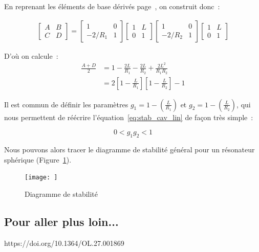 \documentclass[a4paper]{book}
\begin{document}
En reprenant les éléments de base dérivés page~\pageref{subsec:el_base}, on construit donc~:

\begin{gather}
  \begin{bmatrix}
   A & B \\
   C & D 
   \end{bmatrix}
   =
  \begin{bmatrix}
   1 & 0 \\
   -2/R_1 & 1 
  \end{bmatrix}
  \begin{bmatrix}
   1 & L \\
   0 & 1 
   \end{bmatrix}
  \begin{bmatrix}
   1 & 0 \\
   -2/R_2 & 1 
  \end{bmatrix}
  \begin{bmatrix}
   1 & L \\
   0 & 1 
   \end{bmatrix}
\end{gather}

D'où on calcule~:
\begin{align}
\label{eq:stab_cav_lin}
    \frac{A+D}{2}&=1-\frac{2L}{R_1}-\frac{2L}{R_2}+\frac{2L^2}{R_1R_2}\\
                 &=2\left[1-\frac{L}{R_1}\right]\left[1-\frac{L}{R_2}\right]-1
\end{align}

Il est commun de définir les paramètres $g_1 = 1 -\left(\frac{L}{R_1}\right)$ et $g_2 = 1 -\left(\frac{L}{R_2}\right)$, qui nous permettent de réécrire l'équation~\ref{eq:stab_cav_lin} de façon très simple~:

\begin{equation}
    0<g_1g_2<1
\end{equation}

Nous pouvons alors tracer le diagramme de stabilité général pour un résonateur sphérique (Figure~\ref{fig:diag_stab}).

\begin{figure}[!htbp]
\begin{center}
\texttt{[image: ]}
\end{center}
\caption{Diagramme de stabilité }
\label{fig:diag_stab}
\end{figure}

\subsection{Pour aller plus loin...}
https://doi.org/10.1364/OL.27.001869
\end{document}
